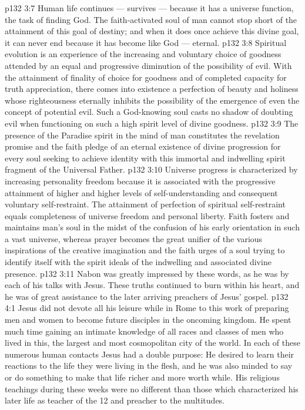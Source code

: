\vs p132 3:7 Human life continues --- survives --- because it has a universe function, the task of finding God. The faith\hyp{}activated soul of man cannot stop short of the attainment of this goal of destiny; and when it does once achieve this divine goal, it can never end because it has become like God --- eternal.
\vs p132 3:8 \pc Spiritual evolution is an experience of the increasing and voluntary choice of goodness attended by an equal and progressive diminution of the possibility of evil. With the attainment of finality of choice for goodness and of completed capacity for truth appreciation, there comes into existence a perfection of beauty and holiness whose righteousness eternally inhibits the possibility of the emergence of even the concept of potential evil. Such a God\hyp{}knowing soul casts no shadow of doubting evil when functioning on such a high spirit level of divine goodness.
\vs p132 3:9 The presence of the Paradise spirit in the mind of man constitutes the revelation promise and the faith pledge of an eternal existence of divine progression for every soul seeking to achieve identity with this immortal and indwelling spirit fragment of the Universal Father.
\vs p132 3:10 Universe progress is characterized by increasing personality freedom because it is associated with the progressive attainment of higher and higher levels of self\hyp{}understanding and consequent voluntary self\hyp{}restraint. The attainment of perfection of spiritual self\hyp{}restraint equals completeness of universe freedom and personal liberty. Faith fosters and maintains man’s soul in the midst of the confusion of his early orientation in such a vast universe, whereas prayer becomes the great unifier of the various inspirations of the creative imagination and the faith urges of a soul trying to identify itself with the spirit ideals of the indwelling and associated divine presence.
\vs p132 3:11 \pc Nabon was greatly impressed by these words, as he was by each of his talks with Jesus. These truths continued to burn within his heart, and he was of great assistance to the later arriving preachers of Jesus’ gospel.
\vs p132 4:1 Jesus did not devote all his leisure while in Rome to this work of preparing men and women to become future disciples in the oncoming kingdom. He spent much time gaining an intimate knowledge of all races and classes of men who lived in this, the largest and most cosmopolitan city of the world. In each of these numerous human contacts Jesus had a double purpose: He desired to learn their reactions to the life they were living in the flesh, and he was also minded to say or do something to make that life richer and more worth while. His religious teachings during these weeks were no different than those which characterized his later life as teacher of the 12 and preacher to the multitudes.

